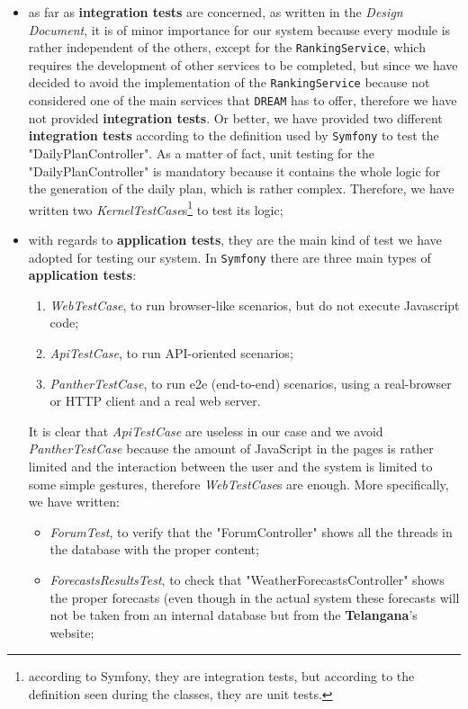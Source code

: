\documentclass{article}
\begin{document}
\begin{itemize}
    \item as far as \textbf{integration tests} are concerned, as written in the \textit{Design Document}, it is of minor importance for our system because every module is rather independent of the others, except for the \verb|RankingService|, which requires the development of other services to be completed, but since we have decided to avoid the implementation of the \verb|RankingService| because not considered one of the main services that \verb|DREAM| has to offer, therefore we have not provided \textbf{integration tests}. Or better, we have provided two different \textbf{integration tests} according to the definition used by \verb|Symfony| to test the "DailyPlanController". As a matter of fact, unit testing for the "DailyPlanController" is mandatory because it contains the whole logic for the generation of the daily plan, which is rather complex. Therefore, we have written two \textit{KernelTestCase}s\footnote{according to Symfony, they are integration tests, but according to the definition seen during the classes, they are unit tests.} to test its logic;
    \item with regards to \textbf{application tests}, they are the main kind of test we have adopted for testing our system. In \verb|Symfony| there are three main types of \textbf{application tests}:
    \begin{enumerate}
        \item \textit{WebTestCase}, to run browser-like scenarios, but do not execute Javascript code;
        \item \textit{ApiTestCase}, to run API-oriented scenarios;
        \item \textit{PantherTestCase}, to run e2e (end-to-end) scenarios, using a real-browser or HTTP client and a real web server.
    \end{enumerate}
    It is clear that \textit{ApiTestCase} are useless in our case and we avoid \textit{PantherTestCase} because the amount of JavaScript in the pages is rather limited and the interaction between the user and the system is limited to some simple gestures, therefore \textit{WebTestCase}s are enough. More specifically, we have written:
    \begin{itemize}
        \item \textit{ForumTest}, to verify that the "ForumController" shows all the threads in the database with the proper content;
        \item \textit{ForecastsResultsTest}, to check that "WeatherForecastsController" shows the proper forecasts (even though in the actual system these forecasts will not be taken from an internal database but from the \textbf{Telangana}'s website;

\end{itemize}
\end{itemize}
\end{document}
